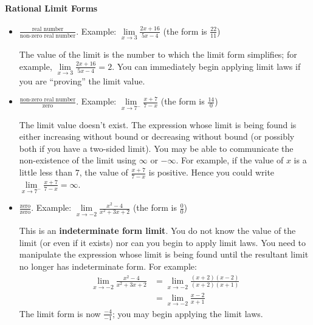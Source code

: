 \documentclass[10pt,oneside,]{book}
\newcommand{\terminology}[1]{\textbf{#1}}
\theoremstyle{plain}
\theoremstyle{definition}
\numberwithin{equation}{section}
\begin{document}
\paragraph[Rational Limit Forms]{Rational Limit Forms}\label{paragraphs-77}
\begin{itemize}[label=\textbullet]
\item{}\(\frac{\text{real number}}{\text{non-zero real number}}\). Example: \(\lim\limits_{x\to3}\frac{2x+16}{5x-4}\) (the form is \(\frac{22}{11}\))%

                \par
The value of the limit is the number to which the limit form simplifies; for example, \(\lim\limits_{x\to3}\frac{2x+16}{5x-4}=2\). You can immediately begin applying limit laws if you are ``proving'' the limit value. %
\end{itemize}
\begin{itemize}[label=\textbullet]
\item{}\(\frac{\text{non-zero real number}}{\text{zero}}\). Example: \(\lim\limits_{x\to7^{-}}\frac{x+7}{7-x}\) (the form is \(\frac{14}{0}\))%

                \par
The limit value doesn't exist. The expression whose limit is being found is either increasing without bound or decreasing without bound (or possibly both if you have a two-sided limit).   You may be able to communicate the non-existence of the limit using \(\infty\) or \(-\infty\). For example, if the value of \(x\) is a little less than \(7\), the value of \(\frac{x+7}{7-x}\) is positive.  Hence you could write \(\lim\limits_{x\to7^{-}}\frac{x+7}{7-x}=\infty\).%
\end{itemize}
\begin{itemize}[label=\textbullet]
\item{}\(\frac{\text{zero}}{\text{zero}}\). Example: \(\lim\limits_{x\to-2}\frac{x^2-4}{x^2+3x+2}\) (the form is \(\frac{0}{0}\))%

                \par
This is an \terminology{indeterminate form limit}. You do not know the value of the limit (or even if it exists) nor can you begin to apply limit laws.  You need to manipulate the expression whose limit is being found until the resultant limit no longer has indeterminate form.  For example:\begin{align*}
\lim_{x\to-2}\frac{x^2-4}{x^2+3x+2}&=\lim_{x\to-2}\frac{(x+2)(x-2)}{(x+2)(x+1)}\\
&=\lim_{x\to-2}\frac{x-2}{x+1}
\end{align*}The limit form is now \(\frac{-4}{-1}\); you may begin applying the limit laws.%
\end{itemize}
\end{document}
